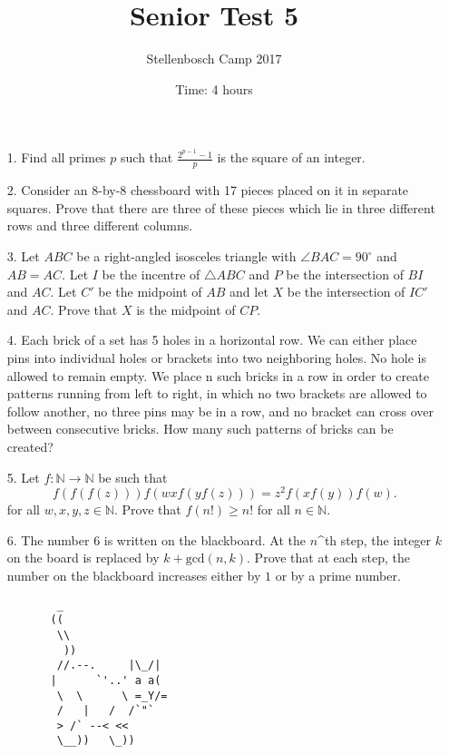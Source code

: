 \documentclass[12pt]{article}
\title{Senior Test 5}
\author{Stellenbosch Camp 2017}
\date{Time: 4 hours}
\begin{document}
 \maketitle

\begin{enumerate}

\item[1.] %
Find all primes $p$ such that $\displaystyle \frac{2^{p-1}-1}{p}$ is the square of an integer.


\item[2.] %
Consider an 8-by-8 chessboard with 17 pieces placed on it in separate squares. Prove that there are three of these pieces which lie in three different rows and three different columns.


\item[3.] %
Let $ABC$ be a right-angled isosceles triangle with $\angle BAC = 90^\circ$ and $AB = AC$. Let $I$ be the incentre of $\triangle ABC$ and $P$ be the intersection of $BI$ and $AC$. Let $C'$ be the midpoint of $AB$ and let $X$ be the intersection of $IC'$ and $AC$. Prove that $X$ is the midpoint of $CP$.


\item[4.] %
Each brick of a set has 5 holes in a horizontal row. We can either place pins into individual holes or brackets into two neighboring holes. No hole is allowed to remain empty. We place n such bricks in a row in order to create patterns running from left to right, in which no two brackets are allowed to follow another, no three pins may be in a row, and no bracket can cross over between consecutive bricks. How many such patterns of bricks can be created?


\item[5.] %
Let $f : \mathbb{N} \to \mathbb{N}$ be such that
  \[ f(f(f(z))) f(wx f(y f(z))) = z^2 f(xf(y)) f(w) .\]
for all $w, x, y, z \in \mathbb{N}$. Prove that $f(n!) \geq n!$ for all $n \in \mathbb{N}$.


\item[6.] %
The number $6$ is written on the blackboard. At the $n$^{th} step, the integer $k$ on the board is replaced by $k + \textrm{gcd}(n, k)$. Prove that at each step, the number on the blackboard increases either by $1$ or by a prime number.

\end{enumerate}

\vfill

\centering
\begin{BVerbatim}
           _ 
          ((
           \\
            ))       
           //.--.     |\_/|
          |      `'..' a a(
           \  \      \ =_Y/=
           /   |   /  /`"`
           > /` --< <<
           \__))   \_))
\end{BVerbatim}
\end{document}

